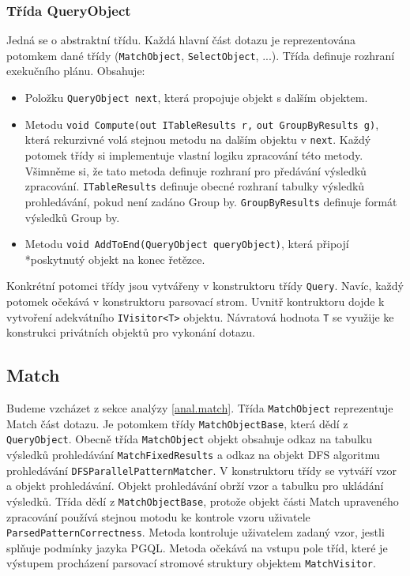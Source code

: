 \subsubsection{Třída QueryObject}

Jedná se o abstraktní třídu.
Každá hlavní část dotazu je reprezentována potomkem dané třídy (\texttt{MatchObject}, \texttt{SelectObject}, ...).
Třída definuje rozhraní exekučního plánu.
Obsahuje:
\begin{itemize}
\item Položku \texttt{QueryObject next}, která propojuje objekt s dalším objektem.
\item Metodu \texttt{void Compute(out ITableResults r,} \texttt{out GroupByResults g)}, která rekurzivné volá stejnou metodu na dalším objektu v \texttt{next}.
Každý potomek třídy si implementuje vlastní logiku zpracování této metody.
Všimněme si, že tato metoda definuje rozhraní pro předávání výsledků zpracování.
\texttt{ITableResults} definuje obecné rozhraní tabulky výsledků prohledávání, pokud není zadáno Group by.
\texttt{GroupByResults} definuje formát výsledků Group by.
\item Metodu \texttt{void AddToEnd(QueryObject queryObject)}, která připojí \\*poskytnutý objekt na konec řetězce.
\end{itemize}
Konkrétní potomci třídy jsou vytvářeny v konstruktoru třídy \texttt{Query}.
Navíc, každý potomek očekává v konstruktoru parsovací strom.
Uvnitř kontruktoru dojde k vytvoření adekvátního \texttt{IVisitor<T>} objektu.
Návratová hodnota \texttt{T} se využije ke konstrukci privátních objektů pro vykonání dotazu.

\subsection{Match}

Budeme vzcházet z sekce analýzy \ref{anal.match}.
Třída \texttt{MatchObject} reprezentuje Match část dotazu.
Je potomkem třídy \texttt{MatchObjectBase}, která dědí z \texttt{QueryObject}.
Obecně třída \texttt{MatchObject} objekt obsahuje odkaz na tabulku výsledků prohledávání \texttt{MatchFixedResults} a odkaz na objekt DFS algoritmu prohledávání \texttt{DFSParallelPatternMatcher}.
V konstruktoru třídy se vytváří vzor a objekt prohledávání.
Objekt prohledávání obrží vzor a tabulku pro ukládání výsledků.
Třída dědí z \texttt{MatchObjectBase}, protože objekt části Match upraveného zpracování používá stejnou motodu ke kontrole vzoru uživatele \texttt{ParsedPatternCorrectness}.
Metoda kontroluje uživatelem zadaný vzor, jestli splňuje podmínky jazyka PGQL. 
Metoda očekává na vstupu pole tříd, které je výstupem procházení parsovací stromové struktury objektem \texttt{MatchVisitor}. 

